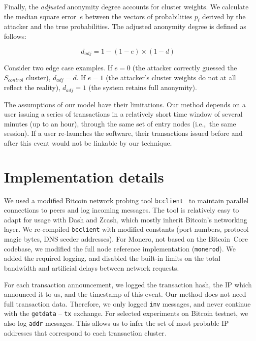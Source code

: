 Finally, the \textit{adjusted} anonymity degree accounts for cluster weights.
We calculate the median square error~$e$ between the vectors of probabilities $p_i$ derived by the attacker and the true probabilities.
The adjusted anonymity degree is defined as follows:

\[
d_{adj} = 1 - (1 - e) \times (1 - d)
\]

Consider two edge case examples.
If $e = 0$ (the attacker correctly guessed the~$S_{control}$ cluster), $d_{adj} = d$.
If $e = 1$ (the attacker's cluster weights do not at all reflect the reality), $d_{adj} = 1$ (the system retains full anonymity).

The assumptions of our model have their limitations.
Our method depends on a user issuing a series of transactions in a relatively short time window of several minutes (up to an hour), through the same set of entry nodes (i.e.,~the same session).
If a user re-launches the software, their transactions issued before and after this event would not be linkable by our technique.


\section{Implementation details}

We used a modified Bitcoin network probing tool \texttt{bcclient}~\cite{Pustogarov2017} to maintain parallel connections to peers and log incoming messages.
The tool is relatively easy to adapt for usage with Dash and Zcash, which mostly inherit Bitcoin's networking layer.
We re-compiled \texttt{bcclient} with modified constants (port numbers, protocol magic bytes, DNS seeder addresses).
For Monero, not based on the Bitcoin~Core codebase, we modified the full node reference implementation (\texttt{monerod}).
We added the required logging, and disabled the built-in limits on the total bandwidth and artificial delays between network requests.

For each transaction announcement, we logged the transaction hash, the IP which announced it to us, and the timestamp of this event.
Our method does not need full transaction data.
Therefore, we only logged \texttt{inv} messages, and never continue with the \texttt{getdata} -- \texttt{tx} exchange.
For selected experiments on Bitcoin testnet, we also log \texttt{addr} messages.
This allows us to infer the set of most probable IP addresses that correspond to each transaction cluster.


